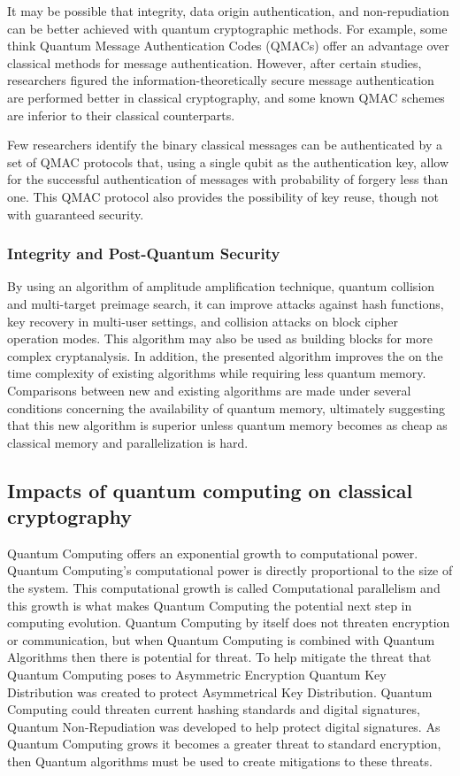 \documentclass[sigconf]{acmart}
\begin{document}
It may be possible that integrity, data origin authentication, and non-repudiation can be better achieved with quantum cryptographic methods. For example, some think Quantum Message Authentication Codes (QMACs) offer an advantage over classical methods for message authentication. However, after certain studies, researchers figured the information-theoretically secure message authentication are performed better in classical cryptography, and some known QMAC schemes are inferior to their classical counterparts\cite{nikolopoulos_information-theoretically_2020}.

Few researchers identify the binary classical messages can be authenticated by a set of QMAC protocols that, using a single qubit as the authentication key, allow for the successful authentication of messages with probability of forgery less than one. This QMAC protocol also provides the possibility of key reuse, though not with guaranteed security\cite{curty_quantum_2001}.


\subsubsection{Integrity and Post-Quantum Security} %
By using an algorithm of amplitude amplification technique, quantum collision and multi-target preimage search, it can improve attacks against hash functions, key recovery in multi-user settings, and collision attacks on block cipher operation modes. This algorithm may also be used as building blocks for more complex cryptanalysis. In addition, the presented algorithm improves the on the time complexity of existing algorithms while requiring less quantum memory. Comparisons between new and existing algorithms are made under several conditions concerning the availability of quantum memory, ultimately suggesting that this new algorithm is superior unless quantum memory becomes as cheap as classical memory and parallelization is hard\cite{chailloux_efficient_2017}.

\subsection{Impacts of quantum computing on classical cryptography}
Quantum Computing offers an exponential growth to computational power. Quantum Computing’s computational power is directly proportional to the size of the system. This computational growth is called Computational parallelism and this growth is what makes Quantum Computing the potential next step in computing evolution. Quantum Computing by itself does not threaten encryption or communication, but when Quantum Computing is combined with Quantum Algorithms then there is potential for threat. To help mitigate the threat that Quantum Computing poses to Asymmetric Encryption Quantum Key Distribution was created to protect Asymmetrical Key Distribution. Quantum Computing could threaten current hashing standards and digital signatures, Quantum Non-Repudiation was developed to help protect digital signatures. As Quantum Computing grows it becomes a greater threat to standard encryption, then Quantum algorithms must be used to create mitigations to these threats.
\end{document}
